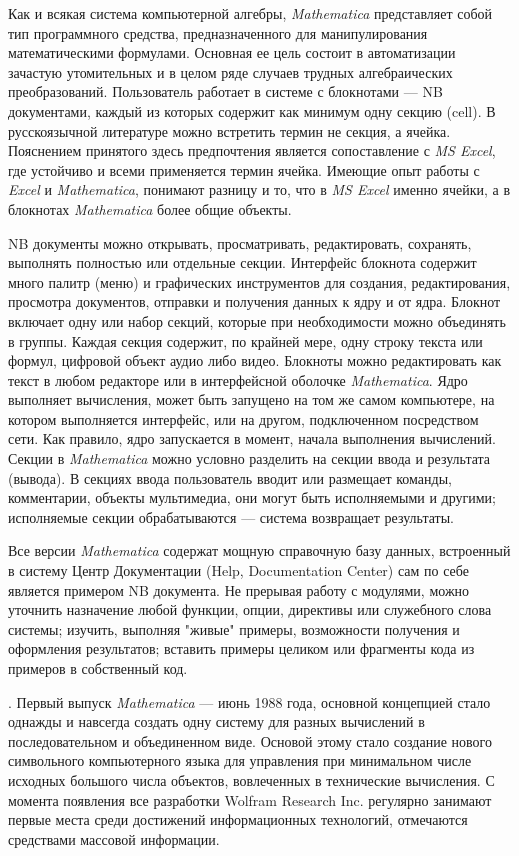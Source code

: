 Как и всякая система компьютерной алгебры, \textit{Mathematica} представляет собой тип программного средства, предназначенного для манипулирования математическими формулами. Основная ее цель состоит в автоматизации зачастую утомительных и в целом ряде случаев трудных алгебраических преобразований. Пользователь работает в системе с блокнотами --- NB документами, каждый из которых содержит как минимум одну секцию (cell). В русскоязычной литературе можно встретить термин не секция, а ячейка. Пояснением принятого здесь предпочтения является сопоставление с \textit{MS Excel}, где устойчиво и всеми применяется термин ячейка. Имеющие опыт работы с \textit{Excel} и \textit{Mathematica}, понимают разницу и то, что в \textit{MS Excel} именно ячейки, а в блокнотах \textit{Mathematica} более общие объекты. 

NB документы можно открывать, просматривать, редактировать, сохранять, выполнять полностью или отдельные секции. Интерфейс блокнота содержит много палитр (меню) и графических инструментов для создания, редактирования, просмотра документов, отправки и получения данных к ядру и от ядра. Блокнот включает одну или набор секций, которые при необходимости можно объединять в группы. Каждая секция содержит, по крайней мере, одну строку текста или формул, цифровой объект аудио либо видео. Блокноты можно редактировать как текст в любом редакторе или в интерфейсной оболочке \textit{Mathematica}. Ядро выполняет вычисления, может быть запущено на том же самом компьютере, на котором выполняется интерфейс, или на другом, подключенном посредством сети. Как правило, ядро запускается в момент, начала выполнения вычислений.
Секции в \textit{Mathematica} можно условно разделить на секции ввода и результата (вывода). В секциях ввода пользователь вводит или размещает команды, комментарии, объекты мультимедиа, они могут быть исполняемыми и другими; исполняемые секции обрабатываются --- система возвращает результаты.

Все версии \textit{Mathematica} содержат мощную справочную базу данных, встроенный в систему Центр Документации (Help, Documentation Center) сам по себе является примером NB документа. Не прерывая работу с модулями, можно уточнить назначение любой функции, опции, директивы или служебного слова системы; изучить, выполняя "живые"{} примеры, возможности получения и оформления результатов; вставить примеры целиком или фрагменты кода из примеров в собственный код.

.
Первый выпуск \textit{Mathematica} --- июнь 1988 года, основной концепцией стало однажды и навсегда создать одну систему для разных вычислений в последовательном и объединенном виде. Основой этому стало создание нового символьного компьютерного языка для управления при минимальном числе исходных большого числа объектов, вовлеченных в технические вычисления. С момента появления все разработки Wolfram Research Inc. регулярно занимают первые места среди достижений информационных технологий, отмечаются средствами массовой информации. 

